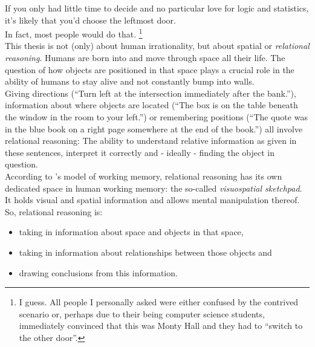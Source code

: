 \documentclass[hidelinks]{scrartcl}
\begin{document}
If you only had little time to decide and no particular love for logic and statistics, it's likely that you'd choose the leftmost door.\\ 
In fact, most people would do that.
\footnote{I guess. All people I personally asked were either confused by the contrived scenario or, perhaps due to their being computer science students, immediately convinced that this was Monty Hall and they had to ``switch to the other door''.}  \\

This thesis is not (only) about human irrationality, but about spatial or \textit{relational reasoning}. Humans are born into and move through space all their life. The question of how objects are positioned in that space plays a crucial role in the ability of humans to stay alive and not constantly bump into walls. \\ Giving directions (``Turn left at the intersection immediately after the bank.''), information about where objects are located (``The box is on the table beneath the window in the room to your left.'') or remembering positions (``The quote was in the blue book on a right page somewhere at the end of the book.'') all involve relational reasoning: The ability to understand relative information as given in these sentences, interpret it correctly and - ideally - finding the object in question. \\
According to \cite{Baddeley.2007}'s model of \gls{working memory}, relational reasoning has its own dedicated space in human working memory: the so-called \textit{visuospatial sketchpad}. It holds visual and spatial information and allows mental manipulation thereof. \\

\noindent So, relational reasoning is:
\begin{itemize}
\item taking in information about space and objects in that space, 
\item taking in information about relationships between those objects and
\item drawing \gls{conclusion}s from this information.
\end{itemize}
\end{document}
